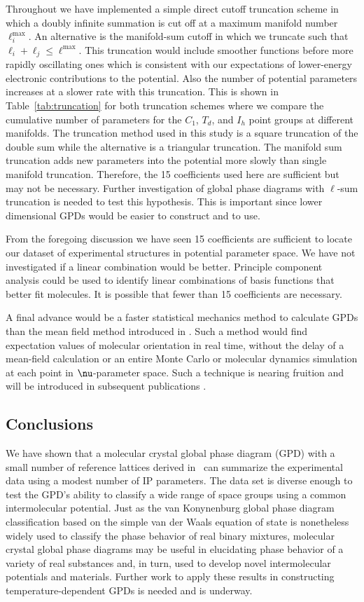 \documentclass[preprint]{iucr}              %
\newcommand{\mb}[1]{\ensuremath{\mbox{\boldmath $ #1 $}}}
\begin{document}
Throughout we have implemented a simple direct cutoff truncation
scheme in which a doubly infinite summation is cut off at a maximum
manifold number $\ell_i^\mathrm{max}$.  An alternative is the
manifold-sum cutoff in which we truncate such that $\ell_i+\ell_j\le
\ell^\mathrm{max}$. This truncation would include smoother functions
before more rapidly oscillating ones which is consistent with our
expectations of lower-energy electronic contributions to the
potential. Also the number of potential parameters increases at a
slower rate with this truncation. This is shown in
Table~\ref{tab:truncation} for both truncation schemes where we
compare the cumulative number of parameters for the $C_1$, $T_d$,
and $I_h$ point groups at different manifolds. The truncation method
used in this study is a square truncation of the double sum while
the alternative is a triangular truncation. The manifold sum
truncation adds new parameters into the potential more slowly than
single manifold truncation. Therefore, the 15 coefficients used here
are sufficient but may not be necessary. Further investigation of
global phase diagrams with $\ell$-sum truncation is needed to test
this hypothesis. This is important since lower dimensional GPDs
would be easier to construct and to use.

From the foregoing discussion we have seen 15 coefficients are
sufficient to locate our dataset of experimental
structures in potential parameter space.  We have not investigated if a linear combination would
be better.  Principle component analysis could be used to identify
linear combinations of basis functions that better fit molecules. It
is possible that fewer than 15 coefficients are necessary.  

A final advance would be a faster statistical mechanics method to calculate GPDs than the mean field method introduced in \cite{Mettes04}.  Such a method would find expectation values of molecular orientation in real time, without the delay of a mean-field calculation or an entire Monte Carlo or molecular dynamics simulation at each point in $\mb{\nu}$-parameter space.  Such a technique is nearing fruition and will be introduced in subsequent publications \cite{Keith09b}.


\subsection{Conclusions}

We have shown that a molecular crystal global phase diagram (GPD)
with a small number of reference lattices derived
in~\cite{McClurg09} can summarize the experimental data using a
modest number of IP parameters. The data set is diverse enough to
test the GPD's ability to classify a wide range of space groups
using a common intermolecular potential. Just as the van Konynenburg
global phase diagram classification based on the simple van der
Waals equation of state is nonetheless widely used to classify the
phase behavior of real binary mixtures, molecular crystal global
phase diagrams may be useful in elucidating phase behavior of a
variety of real substances and, in turn, used to develop novel
intermolecular potentials and materials. Further work to apply these results in constructing temperature-dependent GPDs is needed and is underway.
\end{document}
